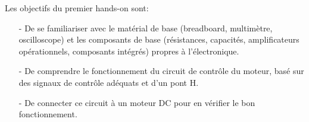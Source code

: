 Les objectifs du premier hands-on sont:
\begin{itemize}
	\item[-] De se familiariser avec le matérial de base (breadboard, multimètre, oscilloscope) et les composants de base (résistances, capacités, amplificateurs opérationnels, composants intégrés) propres à l'électronique.
	\item[-] De comprendre le fonctionnement du circuit de contrôle du moteur, basé sur des signaux de contrôle adéquats et d'un pont H.
	\item[-] De connecter ce circuit à un moteur DC pour en vérifier le bon fonctionnement.
\end{itemize}